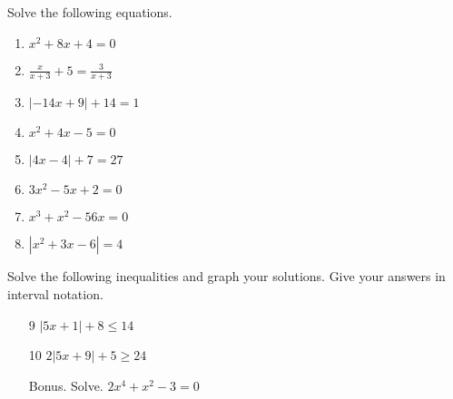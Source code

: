 \documentclass{article}
\begin{document}
\TestTitle[class={College Algebra}, name={Test 1}, term={Spring}, date={Sept. 11}, year={2015}, form={A}]

\AlgebraFacts

Solve the following equations.

\begin{enumerate}
\item 

$x^2 + 8x + 4 = 0$

   \vspace{4cm}

\item $\displaystyle\frac{x}{x + 3} + 5 = \displaystyle\frac{3}{x + 3}$ \vspace{4cm}

\item $|-14x + 9| + 14 = 1$ \vspace{4cm}

\item $x^2 + 4x - 5 = 0$

   \vspace{4cm}

\newpage

\item $|4x - 4| + 7 = 27$ \vspace{5cm}

\item $3x^2 - 5x + 2 = 0$

   \vspace{5cm}

\item $x^3 + x^2 - 56x = 0$

   \vspace{5cm}

\item $|x^2 + 3x - 6| = 4$

   \vspace{5cm}
\end{enumerate}

\newpage

Solve the following inequalities and graph your solutions. Give your answers in interval notation.

\begin{enumerate}
\item[9] $|5x + 1| + 8 \leq 14$ \vspace{5cm}

\item[10] $2|5x + 9| + 5 \geq 24$ \vspace{5cm}

\item[Bonus.] Solve. $2x^4 + x^2 - 3 = 0$

   \vspace{4cm}
\end{enumerate}
\end{document}
